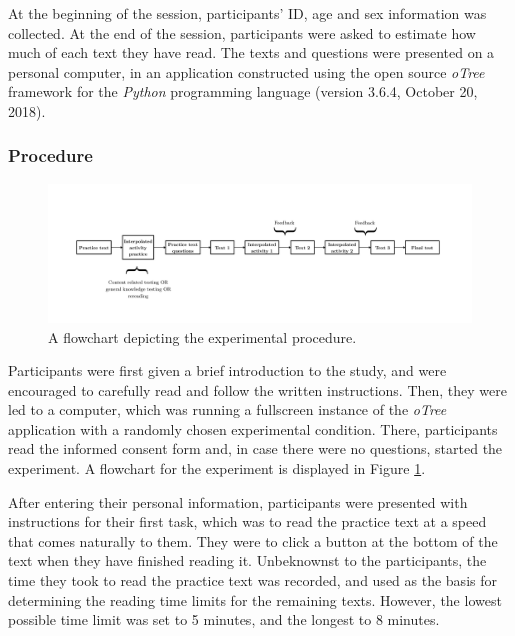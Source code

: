 \documentclass[11pt,]{article}
\begin{document}
At the beginning of the session, participants' ID, age and sex
information was collected. At the end of the session, participants were
asked to estimate how much of each text they have read. The texts and
questions were presented on a personal computer, in an application
constructed using the open source \textit{oTree} framework
\citep[version 2.1.35,][]{chenOTreeOpensourcePlatform2016} for the
\textit{Python} programming language (version 3.6.4, October 20, 2018).

\hypertarget{procedure}{%
\subsubsection{Procedure}\label{procedure}}

\begin{figure}
  \includegraphics[width = \textwidth, keepaspectratio, trim = 135 0 135 90]{../images/flowchart/procedure.pdf}
  \caption{A flowchart depicting the experimental procedure.}
  \label{flowchart}
\end{figure}

Participants were first given a brief introduction to the study, and
were encouraged to carefully read and follow the written instructions.
Then, they were led to a computer, which was running a fullscreen
instance of the \textit{oTree} application with a randomly chosen
experimental condition. There, participants read the informed consent
form and, in case there were no questions, started the experiment. A
flowchart for the experiment is displayed in Figure \ref{flowchart}.

After entering their personal information, participants were presented
with instructions for their first task, which was to read the practice
text at a speed that comes naturally to them. They were to click a
button at the bottom of the text when they have finished reading it.
Unbeknownst to the participants, the time they took to read the practice
text was recorded, and used as the basis for determining the reading
time limits for the remaining texts. However, the lowest possible time
limit was set to 5 minutes, and the longest to 8 minutes.
\end{document}

